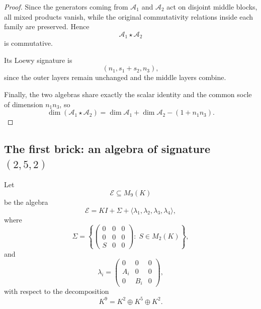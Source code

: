 \documentclass[11pt]{article}
\theoremstyle{remark}
\theoremstyle{plain}
\theoremstyle{definition}
\theoremstyle{myremark}
\begin{document}
\begin{proof}
	Since the generators coming from \(\mathcal A_1\) and \(\mathcal A_2\)
	act on disjoint middle blocks, all mixed products vanish, while the
	original commutativity relations inside each family are preserved.
	Hence
	\[
	\mathcal A_1\star\mathcal A_2
	\]
	is commutative.
	
	Its Loewy signature is
	\[
	(n_1,s_1+s_2,n_3),
	\]
	since the outer layers remain unchanged and the middle layers combine.
	
	Finally, the two algebras share exactly the scalar identity and the
	common socle of dimension \(n_1n_3\), so
	\[
	\dim(\mathcal A_1\star\mathcal A_2)	=
	\dim\mathcal A_1+\dim\mathcal A_2-(1+n_1n_3).
	\]
\end{proof}


\subsection{The first brick: an algebra of signature \((2,5,2)\)}

Let
\[
\mathcal E\subseteq M_9(K)
\]
be the algebra
\[
\mathcal E
=
KI+\Sigma+\langle \lambda_1,\lambda_2,\lambda_3,\lambda_4\rangle,
\]
where
\[
\Sigma=
\left\{
\begin{pmatrix}
	0&0&0\\	0&0&0\\	S&0&0
\end{pmatrix}
:\;
S\in M_2(K)
\right\},
\]
and
\[
\lambda_i=
\begin{pmatrix}
	0&0&0\\	A_i&0&0\\	0&B_i&0
\end{pmatrix},
\]
with respect to the decomposition
\[
K^9=K^2\oplus K^5\oplus K^2.
\]
\end{document}
